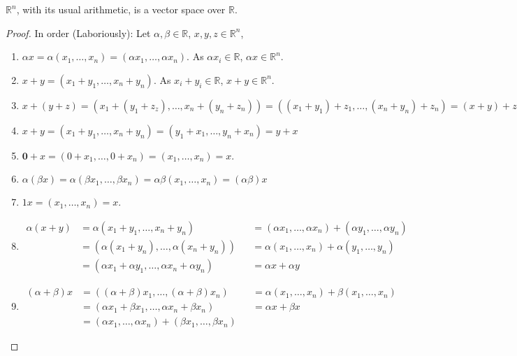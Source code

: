 \documentclass[crop=false,class=article,oneside]{standalone}
\begin{document}
            \begin{theorem}
            $\mathbb{R}^n$, with its usual arithmetic, is a vector space over $\mathbb{R}$.
            \end{theorem}
            \begin{proof}
            In order (Laboriously): Let $\alpha, \beta \in \mathbb{R}$, $x,y,z\in \mathbb{R}^n$,
            \begin{enumerate}
            \item $\alpha x = \alpha(x_1,\hdots,x_n) = (\alpha x_1,\hdots, \alpha x_n)$. As $\alpha x_i \in \mathbb{R}$, $\alpha x \in \mathbb{R}^n$.
            \item $x+y = (x_1+y_1,\hdots,x_n+y_n)$. As $x_i+y_i \in \mathbb{R}$, $x+y\in \mathbb{R}^n$.
            \item $x+(y+z) = (x_1+(y_1+z_z),\hdots, x_n+(y_n+z_n)) = ((x_1+y_1)+z_1,\hdots, (x_n+y_n)+z_n) = (x+y)+z$
            \item $x+y = (x_1+y_1,\hdots,x_n+y_n) = (y_1+x_1,\hdots, y_n+x_n)=y+x$
            \item $\mathbf{0}+x = (0+x_1,\hdots, 0+x_n) = (x_1,\hdots, x_n) = x$.
            \item $\alpha(\beta x) = \alpha(\beta x_1,\hdots, \beta x_n) = \alpha \beta (x_1,\hdots, x_n) = (\alpha \beta) x$
            \item $1 x = (x_1,\hdots, x_n) = x$.
            \item
                \begin{align*}
                    \alpha(x+y) &= \alpha(x_1+y_1,\hdots, x_n+y_n) & &= (\alpha x_1, \hdots, \alpha x_n) + (\alpha y_1,\hdots, \alpha y_n)\\
                    &= (\alpha(x_1+y_n),\hdots, \alpha(x_n+y_n)) & &= \alpha(x_1,\hdots, x_n)+\alpha(y_1,\hdots, y_n)\\
                    &= (\alpha x_1+\alpha y_1,\hdots, \alpha x_n + \alpha y_n) & &= \alpha x + \alpha y
                \end{align*} 
            \item
                \begin{align*}
                    (\alpha + \beta)x &= ((\alpha+\beta)x_1,\hdots, (\alpha+\beta)x_n) & &= \alpha (x_1, \hdots, x_n)+\beta (x_1, \hdots, x_n)\\
                    &= (\alpha x_1 + \beta x_1,\hdots, \alpha x_n + \beta x_n) & &= \alpha x+\beta x\\
                    &= (\alpha x_1,\hdots, \alpha x_n) + (\beta x_1,\hdots, \beta x_n)
                \end{align*}
            \end{enumerate}
            \end{proof}
\end{document}
